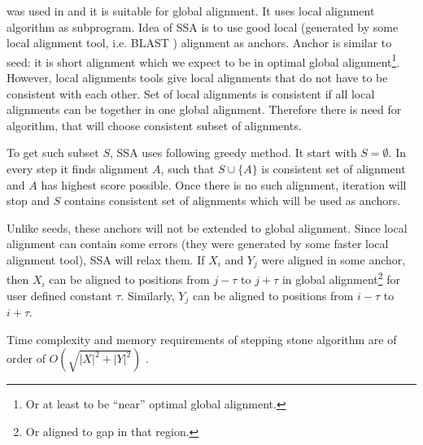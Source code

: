  was used in
\cite{Meyer2002,Pairagon2009} and it is suitable for global alignment. It uses
local alignment algorithm as subprogram. Idea of SSA is to use good local
(generated by some local alignment tool, i.e. BLAST \cite{Altschul1997})
alignment as anchors. Anchor is similar to seed: it is short alignment which we
expect to be in optimal global alignment\footnote{Or at least to be ``near''
optimal global alignment.}.  However, local alignments tools give local
alignments that do not have to be consistent with each other. Set of local
alignments is consistent if all local alignments can be together in one global
alignment.  Therefore there is need for algorithm, that will choose consistent
subset of alignments.

To get such subset $S$, SSA uses following greedy method. It start with
$S=\emptyset$. In every step it finds alignment $A$, such that $S\cup\{A\}$ is
consistent set of alignment and $A$ has highest score possible. Once there is no
such alignment, iteration will stop and $S$ contains consistent set of
alignments which will be used as anchors.

Unlike seeds, these anchors will not be extended to global alignment. Since
local alignment can contain some errors (they were generated by some faster
local alignment tool), SSA will relax them. If $X_i$ and $Y_j$ were aligned in
some anchor, then $X_i$ can be aligned to positions from $j-\tau$ to $j+\tau$ in
global alignment\footnote{Or aligned to gap in that region.} for user defined
constant $\tau$. Similarly, $Y_j$ can be aligned to positions from $i-\tau$ to
$i+\tau$.

Time complexity and memory requirements of stepping stone algorithm are of order
of $O(\sqrt{|X|^2+|Y|^2})$ \cite{Meyer2002}.





